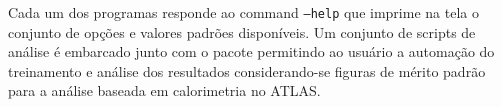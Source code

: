 Cada um dos programas responde ao command \texttt{--help} que imprime na tela
o conjunto de opções e valores padrões disponíveis. Um conjunto de scripts de
análise é embarcado junto com o pacote permitindo ao usuário a automação do
treinamento e análise dos resultados considerando-se figuras de mérito padrão
para a análise baseada em calorimetria no ATLAS.

